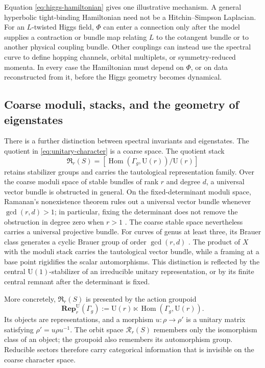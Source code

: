 \documentclass[11pt]{article}
\theoremstyle{definition}
\theoremstyle{remark}
\newcommand{\UU}{\mathrm U}
\newcommand{\Hom}{\operatorname{Hom}}
\newcommand{\cR}{\mathcal R}
\begin{document}
Equation \eqref{eq:higgs-hamiltonian} gives one illustrative mechanism.  A
general hyperbolic tight-binding Hamiltonian need not be a
Hitchin--Simpson Laplacian.  For an \(L\)-twisted Higgs field, \(\Phi\) can
enter a connection only after the model supplies a contraction or bundle map
relating \(L\) to the cotangent bundle or to another physical coupling
bundle.  Other couplings can instead use the spectral curve to define hopping
channels, orbital multiplets, or symmetry-reduced momenta.  In every case the
Hamiltonian must depend on \(\Phi\), or on data reconstructed from it, before
the Higgs geometry becomes dynamical.

\subsection{Coarse moduli, stacks, and the geometry of eigenstates}

There is a further distinction between spectral invariants and eigenstates.
The quotient in \eqref{eq:unitary-character} is a coarse space.  The quotient
stack
\[
        \mathfrak R_r(S)
          =[\Hom(\Gamma_g,\UU(r))/\UU(r)]
          \tag{6.12}\label{eq:rep-stack}
\]
retains stabilizer groups and carries the tautological representation family.
Over the coarse moduli space of stable bundles of rank \(r\) and degree
\(d\), a universal vector bundle is obstructed in general.  On the
fixed-determinant moduli space, Ramanan's nonexistence theorem rules out a
universal vector bundle whenever \(\gcd(r,d)>1\); in particular, fixing the
determinant does not remove the obstruction in degree zero when \(r>1\)
\cite{Ramanan1973}.  The coarse stable space nevertheless carries a universal
projective bundle.  For curves of genus at least three, its Brauer class
generates a cyclic Brauer group of order \(\gcd(r,d)\)
\cite{BiswasSengupta2018}.  The product of \(X\) with the moduli stack carries
the tautological vector bundle, while a framing at a base point rigidifies
the scalar automorphisms.  This distinction is reflected by the central
\(\UU(1)\)-stabilizer of an irreducible unitary representation, or by its
finite central remnant after the determinant is fixed.

More concretely, \(\mathfrak R_r(S)\) is presented by the action groupoid
\[
 \mathbf{Rep}^{\mathrm U}_r(\Gamma_g)
   :=\UU(r)\ltimes\Hom(\Gamma_g,\UU(r)).
\]
Its objects are representations, and a morphism
\(u:\rho\to\rho'\) is a unitary matrix satisfying
\(\rho'=u\rho u^{-1}\).  The orbit space
\(\cR_r(S)\) remembers only the isomorphism class of an object; the groupoid
also remembers its automorphism group.  Reducible sectors therefore carry
categorical information that is invisible on the coarse character space.
\end{document}
